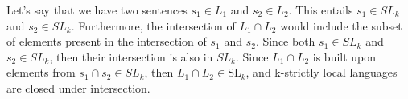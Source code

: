 \documentclass[10pt]{article}
\newenvironment{AnswerBox}{\begin{mdframed}[style=simple]}{\end{mdframed}}
\begin{document}
\begin{AnswerBox}%
Let's say that we have two sentences $s_{1} \in L_{1}$ and $s_{2}\in L_{2}$. This entails $s_{1} \in SL_{k}$ and $s_{2}\in SL_{k}$. Furthermore, the intersection of $L_1 \cap L_2$ would include the subset of elements present in the intersection of $s_{1} $ and $ s_{2}$. Since both $s_{1} \in SL_{k}$ and $s_{2}\in SL_{k}$, then their intersection is also in $SL_{k}$. Since $L_1 \cap L_2$ is built upon elements from $s_{1} \cap s_{2} \in SL_{k}$, then $L_1 \cap L_2 \in \mathrm{SL}_k$, and k-strictly local languages are closed under intersection.
    
\end{AnswerBox}%
\end{document}
